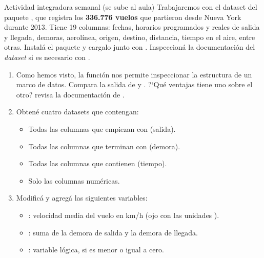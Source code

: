 \documentclass[8pt]{beamer}
\begin{document}
\begin{frame}[fragile]{Actividad integradora semanal (se sube al aula)}
	Trabajaremos con el dataset  del paquete , que registra los \textbf{336.776 vuelos} que partieron desde Nueva York durante 2013. Tiene 19 columnas: fechas, horarios programados y reales de salida y llegada, demoras, aerolínea, origen, destino, distancia, tiempo en el aire, entre otras. Instalá el paquete y cargalo junto con . Inspeccioná la documentación del \emph{dataset} si es necesario con .
	
	

	\begin{enumerate}
		\item Como hemos visto, la función  nos permite inspeccionar la estructura de un marco de datos. Compara la salida de  y . ?`Qu\'e ventajas tiene uno sobre el otro? revisa la documentaci\'on de .

		\item Obten\'e cuatro datasets que contengan:
		\begin{itemize}
			\item Todas las columnas que empiezan con  (salida).
			\item Todas las columnas que terminan con  (demora).
			\item Todas las columnas que contienen  (tiempo).
			\item Solo las columnas numéricas.
		\end{itemize}

		\item Modific\'a  y agreg\'a las siguientes variables:
		\begin{itemize}
			\item {}: velocidad media del vuelo en km/h (ojo con las unidades ).
			\item {}: suma de la demora de salida y la demora de llegada.
			\item {}: variable lógica,  si  es menor o igual a cero.
		\end{itemize}
	\end{enumerate}
\end{frame}
\end{document}
